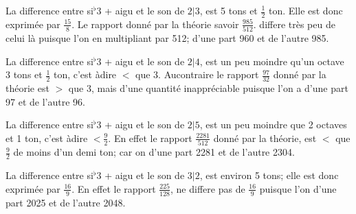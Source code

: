 \documentclass[11pt,a4paper]{article}
\begin{document}

La difference entre si$^{\flat}$3 + aigu et le son de $2|3$, est 5 tons et $\frac{1}{2}$ ton.
Elle est donc exprimée par $\frac{15}{8}$. Le rapport donné par la théorie
savoir $\frac{985}{512}$. differe très peu de celui là puisque l'on  en multipliant
par 512; d'une part 960 et de l'autre 985.

La difference entre si$^{\flat}$3 + aigu et le son de $2|4$, est un peu
moindre qu'un octave 3 tons et $\frac{1}{2}$ ton, c'est àdire $<$ que 3.
Aucontraire le rapport $\frac{97}{32}$ donné par la théorie est $>$ que 3,
mais d'une quantité inappréciable  puisque l'on a d'une part
97 et de l'autre 96.

La difference entre si$^{\flat}$3 + aigu et le son de $2|5$, est
un peu moindre que 2 octaves et 1 ton, c'est àdire $<\frac{9}{2}$.
En effet le rapport $\frac{2281}{512}$ donné par la théorie, est $<$ que $\frac{9}{2}$
de moins d'un demi ton; car on   d'une part 2281 et de
l'autre 2304.

La difference entre si$^{\flat}$3 + aigu et le son de $3|2$, est environ
5 tons; elle est donc exprimée par $\frac{16}{9}$. En effet le rapport
$\frac{225}{128}$,  ne differe pas  de $\frac{16}{9}$  puisque l'on   d'une
part 2025 et de l'autre 2048.
\end{document}
